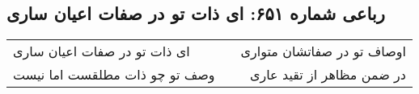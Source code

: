 \begin{center}
\section*{رباعی شماره ۶۵۱: ای ذات تو در صفات اعیان ساری}
\label{sec:sh651}
\begin{longtable}{l p{0.5cm} r}
ای ذات تو در صفات اعیان ساری
&&
اوصاف تو در صفاتشان متواری
\\
وصف تو چو ذات مطلقست اما نیست
&&
در ضمن مظاهر از تقید عاری
\\
\end{longtable}
\end{center}
